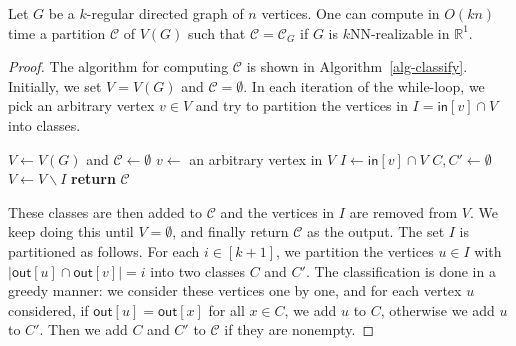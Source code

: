 \begin{lemma} \label{lem-classify}
    Let $G$ be a $k$-regular directed graph of $n$ vertices.
    One can compute in $O(kn)$ time a partition $\mathcal{C}$ of $V(G)$ such that $\mathcal{C} = \mathcal{C}_G$ if $G$ is $k$NN-realizable in $\mathbb{R}^1$.
\end{lemma}

\begin{proof}
The algorithm for computing $\mathcal{C}$ is shown in Algorithm~\ref{alg-classify}.
Initially, we set $V = V(G)$ and $\mathcal{C} = \emptyset$.
In each iteration of the while-loop, we pick an arbitrary vertex $v \in V$ and try to partition the vertices in $I = \mathsf{in}[v] \cap V$ into classes.
\begin{algorithm}[t]
    \caption{\textsc{Classify}$(G)$}
    \begin{algorithmic}[1]
        \State $V \leftarrow V(G)$ and $\mathcal{C} \leftarrow \emptyset$
            \State $v \leftarrow$ an arbitrary vertex in $V$
            \State $I \leftarrow \mathsf{in}[v] \cap V$
                \State $C,C' \leftarrow \emptyset$
                    \EndIf
                \EndFor
                \EndIf
                \EndIf
            \EndFor
            \State $V \leftarrow V \backslash I$
        \EndWhile
        \State \textbf{return} $\mathcal{C}$
    \end{algorithmic}
    \label{alg-classify}
\end{algorithm}
These classes are then added to $\mathcal{C}$ and the vertices in $I$ are removed from $V$.
We keep doing this until $V = \emptyset$, and finally return $\mathcal{C}$ as the output.
The set $I$ is partitioned as follows.
For each $i \in [k+1]$, we partition the vertices $u \in I$ with $|\mathsf{out}[u] \cap \mathsf{out}[v]| = i$ into two classes $C$ and $C'$.
The classification is done in a greedy manner: we consider these vertices one by one, and for each vertex $u$ considered, if $\mathsf{out}[u] = \mathsf{out}[x]$ for all $x \in C$, we add $u$ to $C$, otherwise we add $u$ to $C'$.
Then we add $C$ and $C'$ to $\mathcal{C}$ if they are nonempty.


\end{proof}
